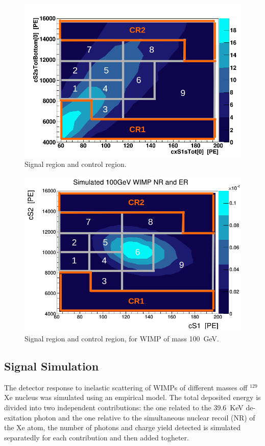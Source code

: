 \begin{figure}[h]
  \includegraphics[width=\linewidth]{images/bkg_in_sr.png}
  \caption{Signal region and control region.}
  \label{fig:SR}
\end{figure}

\begin{figure}[h]
  \includegraphics[width=\linewidth]{images/wimp_in_sr.png}
  \caption{Signal region and control region, for WIMP of mass 100~GeV.}
  \label{fig:SR2}
\end{figure}


\subsection{Signal Simulation} 
The detector response to inelastic scattering of WIMPs of different masses off $^{129}$Xe nucleus was simulated using an empirical model.
The total deposited energy is divided into two independent contributions: the one related to the 39.6~KeV de-exitation photon and the one  relative to
the simultaneous nuclear recoil (NR) of the Xe atom, the number of photons and charge yield detected is simulated separatedly for each contribution
and then added togheter.

